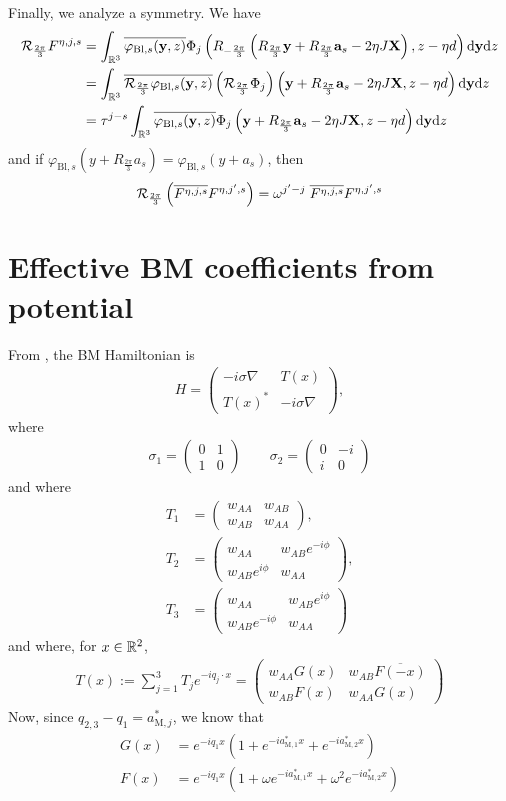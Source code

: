 \documentclass[11pt,a4paper,reqno,french,tikz]{amsart}
\def\d{{\rm d}}
\newcommand{\pa}[1]{\left( #1 \right)} %
\newcommand\vp{\varphi} %
\newcommand{\na}{\nabla} %
\newcommand{\f}[2]{\frac{#1}{#2}} %
\newcommand{\mat}[1]{\begin{pmatrix} #1 \end{pmatrix}} %
\def\bX{{\mathbf X}}
\def\ba{{\mathbf a}}
\def\by{{\mathbf y}}
\begin{document}
Finally, we analyze a symmetry. We have
\begin{align*}
	\cR_{\f{2\pi}{3}} F^{\eta,j,s} &= \int_{\R^3} \overline{\vp_{\text{Bl},s}(\by,z)} \Phi_j \pa{R_{-\f{2\pi}3} \pa{R_{\f{2\pi}{3}}\by + R_{\f{2\pi}{3}} \ba_s -2\eta J \bX},z-\eta d} \d \by \d z \\
 &= \int_{\R^3} \overline{\cR_{\f{2\pi}{3}}\vp_{\text{Bl},s}(\by,z)} \pa{\cR_{\f{2\pi}{3}} \Phi_j} \pa{\by + R_{\f{2\pi}{3}} \ba_s -2\eta J \bX,z-\eta d} \d \by \d z \\
	&= \tau^{j-s} \int_{\R^3} \overline{ \vp_{\text{Bl},s}(\by,z)} \Phi_j \pa{\by + R_{\f{2\pi}{3}} \ba_s -2\eta J \bX,z-\eta d} \d \by \d z \\
\end{align*}
and if $\vp_{\text{Bl},s}(y + R_{\f{2\pi}{3}} a_s) = \vp_{\text{Bl},s}(y + a_s)$, then 
\begin{align*}
\cR_{\f{2\pi}{3}} \pa{ \overline{F^{\eta,j,s}} F^{\eta,j',s}} = \omega^{j'-j} \; \overline{F^{\eta,j,s}} F^{\eta,j',s}
\end{align*}






\section{Effective BM coefficients from potential}%
\label{sec:bm_configuration}


From \cite{BecEmbWitZwo21}, the BM Hamiltonian is
\begin{align*}
	H = \mat{-i\sigma \na & T(x) \\ T(x)^* & -i \sigma \na},
\end{align*}
 where
\begin{align*}
	\sigma_1 = \mat{0 & 1 \\ 1 & 0} \qquad \sigma_2 = \mat{0 & -i \\ i & 0}
\end{align*}
and where
\begin{align*}
	T_1 &= \mat{w_{AA} & w_{AB} \\ w_{AB} & w_{AA}}, \\
	T_2 &= \mat{w_{AA} &  w_{AB}e^{-i\phi} \\  w_{AB}e^{i\phi} & w_{AA}}, \\
	T_3 &= \mat{w_{AA} &  w_{AB}e^{i\phi} \\  w_{AB}e^{-i\phi} & w_{AA}}
\end{align*}
and where, for $x \in \mathbb{R}^2$,
\begin{align*}
	T(x) := \sum_{j=1}^3 T_j e^{-iq_j \cdot x} = \mat{w_{AA} G(x) & w_{AB} \overline{F(-x)} \\ w_{AB} F(x) & w_{AA} G(x)}
\end{align*}
Now, since $q_{2,3} - q_1 = a^*_{\text{M},j}$, we know that
\begin{align*}
G(x) &= e^{-iq_1 x} \pa{1 + e^{-i a_{\text{M} ,1}^* x} +e^{-i a_{\text{M},2}^* x}} \\
F(x) &= e^{-iq_1 x} \pa{1 + \omega e^{-i a_{\text{M} ,1}^* x} + \omega^2 e^{-i a_{\text{M},2}^* x}}
\end{align*}
\end{document}

